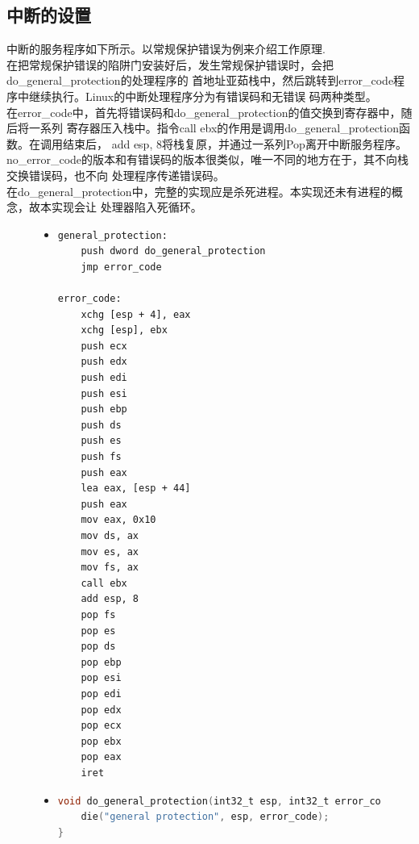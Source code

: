 \documentclass[a4paper]{article}
\begin{document}
    \subsection{中断的设置}\label{sec:int}
    中断的服务程序如下所示。以常规保护错误为例来介绍工作原理.\\ 

    在把常规保护错误的陷阱门安装好后，发生常规保护错误时，会把do\_general\_protection的处理程序的
    首地址亚茹栈中，然后跳转到error\_code程序中继续执行。Linux的中断处理程序分为有错误码和无错误
    码两种类型。\\ 

    在error\_code中，首先将错误码和do\_general\_protection的值交换到寄存器中，随后将一系列
    寄存器压入栈中。指令call ebx的作用是调用do\_general\_protection函数。在调用结束后，
    add esp, 8将栈复原，并通过一系列Pop离开中断服务程序。\\ 

    no\_error\_code的版本和有错误码的版本很类似，唯一不同的地方在于，其不向栈交换错误码，也不向
    处理程序传递错误码。\\ 

    在do\_general\_protection中，完整的实现应是杀死进程。本实现还未有进程的概念，故本实现会让
    处理器陷入死循环。
\begin{figure}[!hbt]
\begin{itemize}
\item[] \begin{lstlisting}[language={[x86masm]Assembler}, label=lst:int, caption=中断的处理]
general_protection:
    push dword do_general_protection
    jmp error_code

error_code:
    xchg [esp + 4], eax
    xchg [esp], ebx
    push ecx
    push edx
    push edi
    push esi
    push ebp
    push ds
    push es
    push fs
    push eax
    lea eax, [esp + 44]
    push eax
    mov eax, 0x10
    mov ds, ax
    mov es, ax
    mov fs, ax
    call ebx
    add esp, 8
    pop fs
    pop es
    pop ds
    pop ebp
    pop esi
    pop edi
    pop edx
    pop ecx
    pop ebx
    pop eax
    iret

\end{lstlisting}
\end{itemize}
\end{figure}
\begin{figure}
\begin{itemize}
\item[] \begin{lstlisting}[language=C, label=lst:do_general_protection, caption=do\_general\_protection的实现]
void do_general_protection(int32_t esp, int32_t error_code) {
    die("general protection", esp, error_code);
}
\end{lstlisting}
\end{itemize}
\end{figure}
\end{document}
